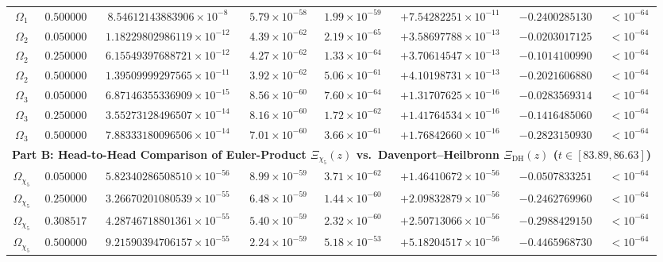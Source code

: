 \documentclass[11pt,reqno]{amsart}
\theoremstyle{definition}
\theoremstyle{remark}
\numberwithin{equation}{section}
\newcommand{\DHf}{\mathrm{DH}}
\begin{document}
\begin{table}[htbp]
\begin{tabular}{@{}cccccccc@{}}
$\Omega_1$ & $0.500000$ & $8.54612143883906 \times 10^{-8}$ & $5.79 \times 10^{-58}$ & $1.99 \times 10^{-59}$ & $+7.54282251 \times 10^{-11}$ & $-0.2400285130$ & $< 10^{-64}$ \\
$\Omega_2$ & $0.050000$ & $1.18229802986119 \times 10^{-12}$ & $4.39 \times 10^{-62}$ & $2.19 \times 10^{-65}$ & $+3.58697788 \times 10^{-13}$ & $-0.0203017125$ & $< 10^{-64}$ \\
$\Omega_2$ & $0.250000$ & $6.15549397688721 \times 10^{-12}$ & $4.27 \times 10^{-62}$ & $1.33 \times 10^{-64}$ & $+3.70614547 \times 10^{-13}$ & $-0.1014100990$ & $< 10^{-64}$ \\
$\Omega_2$ & $0.500000$ & $1.39509999297565 \times 10^{-11}$ & $3.92 \times 10^{-62}$ & $5.06 \times 10^{-61}$ & $+4.10198731 \times 10^{-13}$ & $-0.2021606880$ & $< 10^{-64}$ \\
$\Omega_3$ & $0.050000$ & $6.87146355336909 \times 10^{-15}$ & $8.56 \times 10^{-60}$ & $7.60 \times 10^{-64}$ & $+1.31707625 \times 10^{-16}$ & $-0.0283569314$ & $< 10^{-64}$ \\
$\Omega_3$ & $0.250000$ & $3.55273128496507 \times 10^{-14}$ & $8.16 \times 10^{-60}$ & $1.72 \times 10^{-62}$ & $+1.41764534 \times 10^{-16}$ & $-0.1416485060$ & $< 10^{-64}$ \\
$\Omega_3$ & $0.500000$ & $7.88333180096506 \times 10^{-14}$ & $7.01 \times 10^{-60}$ & $3.66 \times 10^{-61}$ & $+1.76842660 \times 10^{-16}$ & $-0.2823150930$ & $< 10^{-64}$ \\
\midrule
\multicolumn{8}{c}{\textbf{Part B: Head-to-Head Comparison of Euler-Product $\Xi_{\chi_5}(z)$ vs.\ Davenport--Heilbronn $\Xi_{\DHf}(z)$ ($t \in [83.89, 86.63]$)}} \\
\midrule
$\Omega_{\chi_5}$ & $0.050000$ & $5.82340286508510 \times 10^{-56}$ & $8.99 \times 10^{-59}$ & $3.71 \times 10^{-62}$ & $+1.46410672 \times 10^{-56}$ & $-0.0507833251$ & $< 10^{-64}$ \\
$\Omega_{\chi_5}$ & $0.250000$ & $3.26670201080539 \times 10^{-55}$ & $6.48 \times 10^{-59}$ & $1.44 \times 10^{-60}$ & $+2.09832879 \times 10^{-56}$ & $-0.2462769960$ & $< 10^{-64}$ \\
$\Omega_{\chi_5}$ & $0.308517$ & $4.28746718801361 \times 10^{-55}$ & $5.40 \times 10^{-59}$ & $2.32 \times 10^{-60}$ & $+2.50713066 \times 10^{-56}$ & $-0.2988429150$ & $< 10^{-64}$ \\
$\Omega_{\chi_5}$ & $0.500000$ & $9.21590394706157 \times 10^{-55}$ & $2.24 \times 10^{-59}$ & $5.18 \times 10^{-53}$ & $+5.18204517 \times 10^{-56}$ & $-0.4465968730$ & $< 10^{-64}$ \\

\end{tabular}
\end{table}
\end{document}
